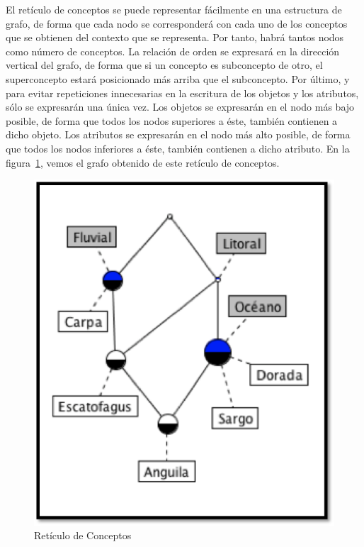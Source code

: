 El retículo de conceptos se puede representar fácilmente en una estructura de grafo, de forma que cada nodo se corresponderá con cada uno de los conceptos que se obtienen del contexto que se representa. Por tanto, habrá tantos nodos como número de conceptos. La relación de orden se expresará en la dirección vertical del grafo, de forma que si un concepto es subconcepto de otro, el superconcepto estará posicionado más arriba que el subconcepto. Por último, y para evitar repeticiones innecesarias en la escritura de los objetos y los atributos, sólo se expresarán una única vez. Los objetos se expresarán en el nodo más bajo posible, de forma que todos los nodos superiores a éste, también contienen a dicho objeto. Los atributos se expresarán en el nodo más alto posible, de forma que todos los nodos inferiores a éste, también contienen a dicho atributo. En la figura~\ref{fig:reticulo}, vemos el grafo obtenido de este retículo de conceptos.

\begin{figure}[t]
\centering
\includegraphics[scale=0.75]{img/2/reticulo}
\caption{Retículo de Conceptos
\label{fig:reticulo}}
\end{figure}



